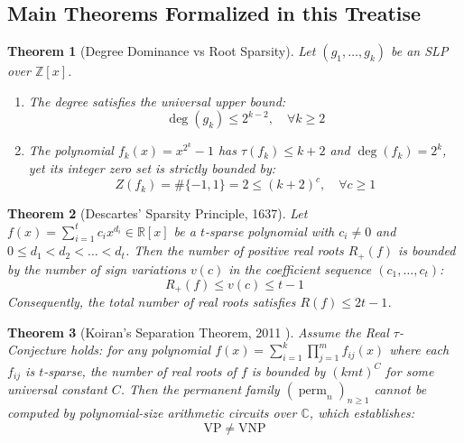 \documentclass[11pt,a4paper]{article}
\newtheorem{theorem}{Theorem}[section]
\theoremstyle{definition}
\begin{document}
\subsection{Main Theorems Formalized in this Treatise}

\begin{theorem}[Degree Dominance vs Root Sparsity]\label{thm:degree_dominance}
Let $(g_1, \dots, g_k)$ be an SLP over $\mathbb{Z}[x]$.
\begin{enumerate}
    \item The degree satisfies the universal upper bound:
    \begin{equation}\label{eq:deg_upper}
    \deg(g_k) \le 2^{k-2}, \quad \forall k \ge 2
    \end{equation}
    \item The polynomial $f_k(x) = x^{2^k} - 1$ has $\tau(f_k) \le k + 2$ and $\deg(f_k) = 2^k$, yet its integer zero set is strictly bounded by:
    \begin{equation}\label{eq:f_k_roots}
    Z(f_k) = \# \{-1, 1\} = 2 \le (k+2)^c, \quad \forall c \ge 1
    \end{equation}
\end{enumerate}
\end{theorem}

\begin{theorem}[Descartes' Sparsity Principle, 1637]\label{thm:descartes_main}
Let $f(x) = \sum_{i=1}^t c_i x^{d_i} \in \mathbb{R}[x]$ be a $t$-sparse polynomial with $c_i \ne 0$ and $0 \le d_1 < d_2 < \dots < d_t$. Then the number of positive real roots $R_+(f)$ is bounded by the number of sign variations $v(c)$ in the coefficient sequence $(c_1, \dots, c_t)$:
\begin{equation}\label{eq:descartes_signs}
R_+(f) \le v(c) \le t - 1
\end{equation}
Consequently, the total number of real roots satisfies $R(f) \le 2t - 1$.
\end{theorem}

\begin{theorem}[Koiran's Separation Theorem, 2011 \cite{koiran2011}]\label{thm:koiran_main}
Assume the Real $\tau$-Conjecture holds: for any polynomial $f(x) = \sum_{i=1}^k \prod_{j=1}^m f_{ij}(x)$ where each $f_{ij}$ is $t$-sparse, the number of real roots of $f$ is bounded by $(k m t)^C$ for some universal constant $C$.
Then the permanent family $(\operatorname{perm}_n)_{n \ge 1}$ cannot be computed by polynomial-size arithmetic circuits over $\mathbb{C}$, which establishes:
\begin{equation}\label{eq:vp_vnp_main}
\mathrm{VP} \ne \mathrm{VNP}
\end{equation}
\end{theorem}
\end{document}
